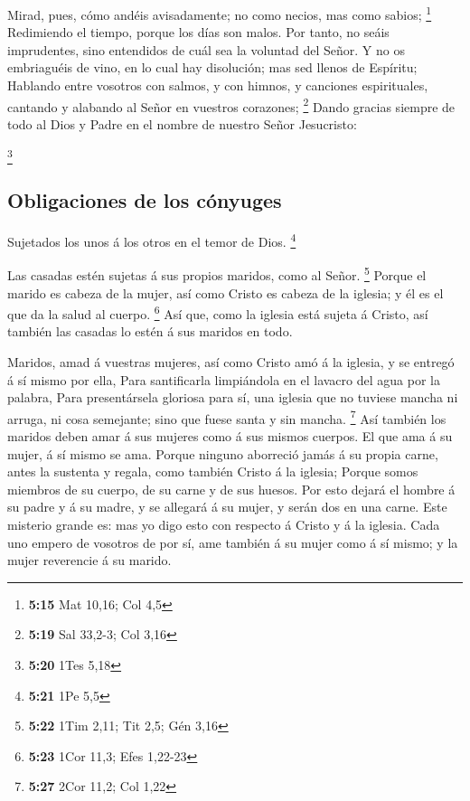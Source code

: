  Mirad, pues, cómo andéis avisadamente; no como necios,
mas como sabios; \footnote{\textbf{5:15} Mat 10,16; Col 4,5}
 Redimiendo el tiempo, porque los días son malos.
 Por tanto, no seáis imprudentes, sino entendidos de cuál
sea la voluntad del Señor.  Y no os embriaguéis de vino,
en lo cual hay disolución; mas sed llenos de Espíritu; 
Hablando entre vosotros con salmos, y con himnos, y canciones
espirituales, cantando y alabando al Señor en vuestros corazones;
\footnote{\textbf{5:19} Sal 33,2-3; Col 3,16}  Dando
gracias siempre de todo al Dios y Padre en el nombre de nuestro Señor
Jesucristo:

\footnote{\textbf{5:20} 1Tes 5,18}

\hypertarget{obligaciones-de-los-cuxf3nyuges}{%
\subsection{Obligaciones de los
cónyuges}\label{obligaciones-de-los-cuxf3nyuges}}

 Sujetados los unos á los otros en el temor de Dios.
\footnote{\textbf{5:21} 1Pe 5,5}

 Las casadas estén sujetas á sus propios maridos, como al
Señor. \footnote{\textbf{5:22} 1Tim 2,11; Tit 2,5; Gén 3,16}
 Porque el marido es cabeza de la mujer, así como Cristo
es cabeza de la iglesia; y él es el que da la salud al cuerpo.
\footnote{\textbf{5:23} 1Cor 11,3; Efes 1,22-23}  Así
que, como la iglesia está sujeta á Cristo, así también las casadas lo
estén á sus maridos en todo.

 Maridos, amad á vuestras mujeres, así como Cristo amó á
la iglesia, y se entregó á sí mismo por ella,  Para
santificarla limpiándola en el lavacro del agua por la palabra,
 Para presentársela gloriosa para sí, una iglesia que no
tuviese mancha ni arruga, ni cosa semejante; sino que fuese santa y sin
mancha. \footnote{\textbf{5:27} 2Cor 11,2; Col 1,22}  Así
también los maridos deben amar á sus mujeres como á sus mismos cuerpos.
El que ama á su mujer, á sí mismo se ama.  Porque ninguno
aborreció jamás á su propia carne, antes la sustenta y regala, como
también Cristo á la iglesia;  Porque somos miembros de su
cuerpo, de su carne y de sus huesos.  Por esto dejará el
hombre á su padre y á su madre, y se allegará á su mujer, y serán dos en
una carne.  Este misterio grande es: mas yo digo esto con
respecto á Cristo y á la iglesia.  Cada uno empero de
vosotros de por sí, ame también á su mujer como á sí mismo; y la mujer
reverencie á su marido.

